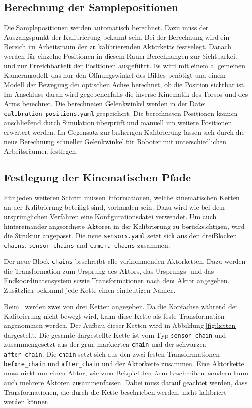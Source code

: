 \subsection{Berechnung der Samplepositionen}
\label{sub:Berechnung der Samplepositionen}
Die Samplepositionen werden automatisch berechnet. Dazu muss der Ausgangspunkt 
der Kalibrierung bekannt sein. Bei der Berechnung wird ein Bereich im Arbeitsraum
der zu kalibrierenden Aktorkette festgelegt. Danach werden für einzelne
Positionen in diesem Raum Berechnungen zur Sichtbarkeit und zur Erreichbarkeit 
der Positionen ausgeführt. Es wird mit einem allgemeinen Kameramodell, das nur
den Öffnungswinkel des Bildes benötigt und einem Modell der Bewegung der 
optischen Achse berechnet, ob die Position sichtbar ist. Im Anschluss daran wird
gegebenenfalls die inverse Kinematik des Torsos und des Arms berechnet. Die 
berechneten Gelenkwinkel werden in der Datei \texttt{calibration\_positions.yaml}
gespeichert. Die berechneten Positionen können anschließend durch Simulation
überprüft und manuell um weitere Positionen erweitert werden. Im Gegensatz zur 
bisherigen Kalibrierung lassen sich durch die neue Berechnung schneller
Gelenkwinkel für Roboter mit unterschiedlichen Arbeitsräumen festlegen. 

\subsection{Festlegung der Kinematischen Pfade}
\label{sub:Festlegung der Kinematischen Pfade}
Für jeden weiteren Schritt müssen Informationen, welche
kinematischen Ketten an der Kalibrierung beteiligt sind, vorhanden sein.
Dazu wird wie bei dem ursprünglichen Verfahren eine Konfigurationsdatei 
verwendet. Um auch hintereinander angeordnete Aktoren in der Kalibrierung zu 
berücksichtigen, wird die Struktur angepasst. Die neue \texttt{sensors.yaml} 
setzt sich aus den dreiBlöcken \texttt{chains}, \texttt{sensor\_chains} 
und \texttt{camera\_chains} zusammen.

Der neue Block \texttt{chains} beschreibt alle vorkommenden Aktorketten. Dazu 
werden die Transformation zum Ursprung des Aktors, das Ursprungs- und das 
Endkoordinatensystem sowie Transformationen nach dem Aktor angegeben. Zusätzlich
bekommt jede Kette einen eindeutigen Namen.

Beim \cob\ werden zwei von drei Ketten angegeben. Da die Kopfachse während der
Kalibrierung nicht bewegt wird, kann diese Kette als feste Transformation 
angenommen werden. Der Aufbau dieser Ketten wird in Abbildung \ref{fig:ketten}
dargestellt. Die gesamte dargestellte Kette ist vom Typ \texttt{sensor\_chain}
und zusammengesetzt aus der grün markierten \texttt{chain} und der schwarzen 
  \texttt{after\_chain}. Die \texttt{chain} setzt sich aus den zwei festen 
  Transformationen \texttt{before\_chain} und \texttt{after\_chain} und der
  Aktorkette zusammen.
  Eine Aktorkette muss nicht nur einen Aktor, wie zum Beispiel den Arm
  beschreiben, sondern kann auch mehrere Aktoren zusammenfassen. Dabei muss 
  darauf geachtet werden, dass Transformationen, die durch die Kette beschrieben
  werden, nicht kalibriert werden können.

